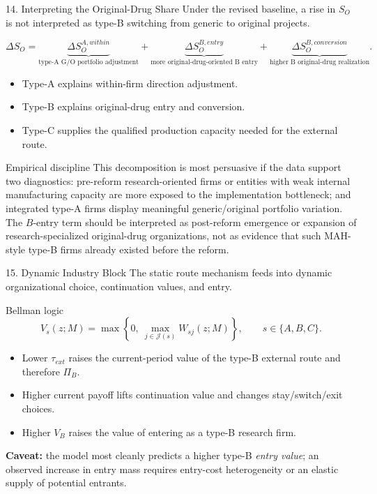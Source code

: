 \documentclass[aspectratio=169,11pt]{beamer}
\begin{document}
\begin{frame}{14. Interpreting the Original-Drug Share}
\small
Under the revised baseline, a rise in \(S_O\) is not interpreted as type-B switching from generic to original projects.

\vspace{0.1cm}
\[
\Delta S_O=
\underbrace{\Delta S_O^{A,within}}_{\text{type-A G/O portfolio adjustment}}
+
\underbrace{\Delta S_O^{B,entry}}_{\text{more original-drug-oriented B entry}}
+
\underbrace{\Delta S_O^{B,conversion}}_{\text{higher B original-drug realization}}.
\]

\begin{itemize}
\item Type-A explains within-firm direction adjustment.
\item Type-B explains original-drug entry and conversion.
\item Type-C supplies the qualified production capacity needed for the external route.
\end{itemize}

\begin{block}{Empirical discipline}
This decomposition is most persuasive if the data support two diagnostics: pre-reform research-oriented firms or entities with weak internal manufacturing capacity are more exposed to the implementation bottleneck; and integrated type-A firms display meaningful generic/original portfolio variation. The \(B\)-entry term should be interpreted as post-reform emergence or expansion of research-specialized original-drug organizations, not as evidence that such MAH-style type-B firms already existed before the reform.
\end{block}
\end{frame}

\begin{frame}{15. Dynamic Industry Block}
\small
The static route mechanism feeds into dynamic organizational choice, continuation values, and entry.

\vspace{0.08cm}
\begin{block}{Bellman logic}
\[
V_s(z;M)=\max\left\{0,\ \max_{j\in\mathcal{J}(s)} W_{sj}(z;M)\right\},
\qquad s\in\{A,B,C\}.
\]
\end{block}

\begin{itemize}
\item Lower \(\tau_{ext}\) raises the current-period value of the type-B external route and therefore \(\Pi_B\).
\item Higher current payoff lifts continuation value and changes stay/switch/exit choices.
\item Higher \(V_B\) raises the value of entering as a type-B research firm.
\end{itemize}

\vspace{0.05cm}
\textbf{Caveat:} the model most cleanly predicts a higher type-B \emph{entry value}; an observed increase in entry mass requires entry-cost heterogeneity or an elastic supply of potential entrants.
\end{frame}
\end{document}
